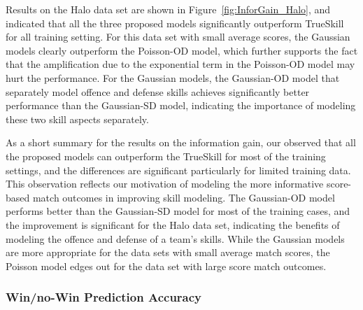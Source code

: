 \begin{center}
\begin{figure*}[htbp!]
 \centering
\caption{\small Results on the AFL data set, evaluated
using information gain. Error bars indicate
95\% confidence intervals.}
\label{fig:InforGain_AFL}
\end{figure*}
\end{center}

Results on the Halo data set are shown in Figure~\ref{fig:InforGain_Halo}, and indicated that all the three proposed models significantly outperform TrueSkill for all training setting. For this data set with small average scores, the Gaussian models clearly outperform the Poisson-OD model, which further supports the fact that the amplification due to the exponential term in the Poisson-OD model may hurt the performance. For the Gaussian models, the Gaussian-OD model that separately model offence and defense skills achieves significantly better performance than the Gaussian-SD model, indicating the importance of modeling these two skill aspects separately. 

\begin{center}
\begin{figure*}[t!]
 \centering
\caption{\small Results on the Halo 2 data set, evaluated
using information gain. Error bars indicate
95\% confidence intervals.}
\label{fig:InforGain_Halo}
\end{figure*}
\end{center}

As a short summary for the results on the information gain, our observed that all the proposed models can outperform the TrueSkill for most of the training settings, and the differences are significant particularly for limited training data. This observation reflects our motivation of modeling the more informative score-based match outcomes in improving skill modeling. The Gaussian-OD model performs better than the Gaussian-SD model for most of the training cases, and the improvement is significant for the Halo data set, indicating the benefits of modeling the offence and defense of a team's skills. While the Gaussian models are more appropriate for the data sets with small average match scores, the Poisson model edges out for the data set with large score match outcomes. 

\subsubsection{Win/no-Win Prediction Accuracy }

